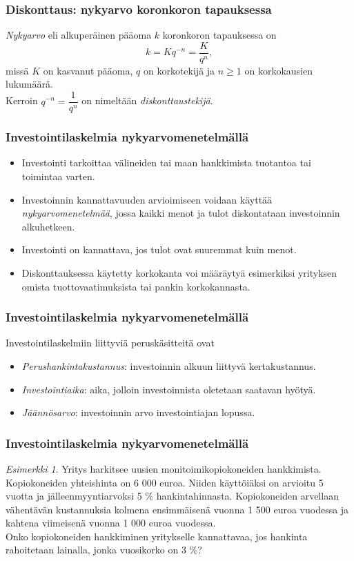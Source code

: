 \documentclass{article}\usepackage[]{graphicx}\usepackage[]{color}
\theoremstyle{remark}
\newtheorem{esim}{Esimerkki}
\newcommand{\pblock}{\\ \vspace{0.5cm}\pause}
\begin{document}
\begin{frame}
    \frametitle{Diskonttaus: nykyarvo koronkoron tapauksessa}
    \pause
    \begin{block}{}
        \emph{Nykyarvo} eli alkuperäinen pääoma $k$ koronkoron tapauksessa on
        \[
            k = Kq^{-n} = \frac{K}{q^n},
        \]
        missä $K$ on kasvanut pääoma, $q$ on korkotekijä ja $n \geq 1$ on korkokausien lukumäärä.
        \pblock
        Kerroin $q^{-n} = \dfrac{1}{q^n}$ on nimeltään \emph{diskonttaustekijä}.
    \end{block}
\end{frame}

\begin{frame}
    \frametitle{Investointilaskelmia nykyarvomenetelmällä}
    \begin{itemize}
        \item {Investointi} tarkoittaa välineiden tai maan hankkimista tuotantoa tai toimintaa varten. \pause
        \item Investoinnin kannattavuuden arvioimiseen voidaan käyttää \emph{nykyarvomenetelmää}, jossa kaikki menot ja tulot diskontataan investoinnin alkuhetkeen.  \pause
        \item Investointi on kannattava, jos tulot ovat suuremmat kuin menot. \pause
        \item Diskonttauksessa käytetty korkokanta voi määräytyä esimerkiksi yrityksen omista tuottovaatimuksista tai pankin korkokannasta.
    \end{itemize}
\end{frame}

\begin{frame}
    \frametitle{Investointilaskelmia nykyarvomenetelmällä}
    Investointilaskelmiin liittyviä peruskäsitteitä ovat \pause
    \begin{itemize}
        \item \emph{Perushankintakustannus}: investoinnin alkuun liittyvä kertakustannus. \pause
        \item \emph{Investointiaika}: aika, jolloin investoinnista oletetaan saatavan hyötyä. \pause
        \item \emph{Jäännösarvo}: investoinnin arvo investointiajan lopussa.
    \end{itemize}
\end{frame}

\begin{frame}
\frametitle{Investointilaskelmia nykyarvomenetelmällä}
    \begin{esim}
    Yritys harkitsee uusien monitoimikopiokoneiden hankkimista.
    Kopiokoneiden yhteishinta on 6 000 euroa. Niiden käyttöiäksi on arvioitu 5 vuotta ja jälleenmyyntiarvoksi 5 \% hankintahinnasta.
    Kopiokoneiden arvellaan vähentävän kustannuksia kolmena ensimmäisenä vuonna 1 500 euroa vuodessa ja kahtena viimeisenä vuonna 1 000 euroa vuodessa.
    \pblock
    Onko kopiokoneiden hankkiminen yritykselle kannattavaa, jos hankinta rahoitetaan lainalla, jonka vuosikorko on 3 \%?
    \end{esim}
\end{frame}
\end{document}
